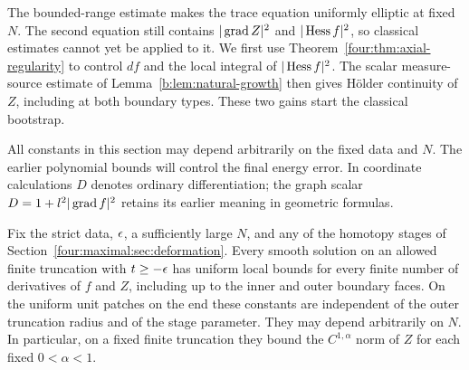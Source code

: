 The bounded-range estimate makes the trace equation uniformly elliptic
at fixed $N$.  The second equation still contains $|\operatorname{grad} Z|^2$ and
$|\operatorname{Hess} f|^2$, so classical estimates cannot yet be applied to it.
We first use Theorem~\ref{four:thm:axial-regularity} to control $df$
and the local integral of $|\operatorname{Hess} f|^2$.  The scalar measure-source
estimate of Lemma~\ref{b:lem:natural-growth} then gives H\"older
continuity of $Z$, including at both boundary types.  These two gains
start the classical bootstrap.

All constants in this section may depend arbitrarily on the fixed data
and $N$.  The earlier polynomial bounds will control the final energy
error.  In coordinate calculations $D$ denotes ordinary differentiation;
the graph scalar $D=1+l^2|\operatorname{grad} f|^2$ retains its earlier meaning in
geometric formulas.

\begin{proposition}\label{four:maximal:prop:classical-estimates}
Fix the strict data, $\epsilon$, a sufficiently large $N$, and any of the
homotopy stages of Section~\ref{four:maximal:sec:deformation}.  Every smooth
solution on an allowed finite truncation with $t\ge-\epsilon$ has uniform
local bounds for every finite number of derivatives of $f$ and $Z$,
including up to the inner and outer boundary faces.  On the uniform
unit patches on the end these constants are independent of the
outer truncation radius and of the stage parameter.  They may depend
arbitrarily on $N$.  In particular, on a fixed finite truncation they
bound the $C^{1,\alpha}$ norm of $Z$ for each fixed $0<\alpha<1$.
\end{proposition}

